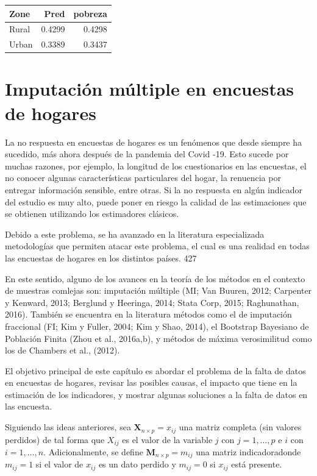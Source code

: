 \documentclass[
  spanish,
  12pt,
]{book}
\begin{document}
\begin{tabular}{l|r|r}
\hline
Zone & Pred & pobreza\\
\hline
Rural & 0.4299 & 0.4298\\
\hline
Urban & 0.3389 & 0.3437\\
\hline
\end{tabular}

\chapter{Imputación múltiple en encuestas de hogares}\label{imputaciuxf3n-muxfaltiple-en-encuestas-de-hogares}

La no respuesta en encuestas de hogares es un fenómenos que desde siempre ha sucedido, más ahora después de la pandemia del Covid -19. Esto sucede por muchas razones, por ejemplo, la longitud de los cuestionarios en las encuestas, el no conocer algunas características particulares del hogar, la renuencia por entregar información sensible, entre otras. Si la no respuesta en algún indicador del estudio es muy alto, puede poner en riesgo la calidad de las estimaciones que se obtienen utilizando los estimadores clásicos.

Debido a este problema, se ha avanzado en la literatura especializada metodologías que permiten atacar este problema, el cual es una realidad en todas las encuestas de hogares en los distintos países. 427

En este sentido, alguno de los avances en la teoría de los métodos en el contexto de muestras comlejas son: imputación múltiple (MI; Van Buuren, 2012; Carpenter y Kenward, 2013; Berglund y Heeringa, 2014; Stata Corp, 2015; Raghunathan, 2016). También se encuentra en la literatura métodos como el de imputación fraccional (FI; Kim y Fuller, 2004; Kim y Shao, 2014), el Bootstrap Bayesiano de Población Finita (Zhou et al., 2016a,b), y métodos de máxima verosimilitud como los de Chambers et al., (2012).

El objetivo principal de este capítulo es abordar el problema de la falta de datos en encuestas de hogares, revisar las posibles causas, el impacto que tiene en la estimación de los indicadores, y mostrar algunas soluciones a la falta de datos en las encuesta.

Siguiendo las ideas anteriores, sea \(\boldsymbol{X}_{n \times p} = x_{ij}\) una matriz completa (sin valores perdidos) de tal forma que \(X_{ij}\) es el valor de la variable \(j\) con \(j=1, \dots, p\) e \(i\) con \(i=1, \dots, n\). Adicionalmente, se define \(\boldsymbol{M}_{n \times p} = m_{ij}\) una matriz indicadoradonde \(m_{ij} = 1\) si el valor de \(x_{ij}\) es un dato perdido y \(m_{ij}=0\) si \(x_{ij}\) está presente.
\end{document}

